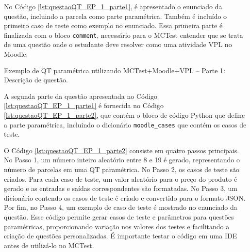 No Código \ref{lst:questaoQT_EP_1_parte1}, é apresentado o enunciado da questão, incluindo a parcela como parte paramétrica. Também é incluído o primeiro caso de teste como exemplo no enunciado. Essa primeira parte é finalizada com o bloco \verb|comment|, necessário para o MCTest entender que se trata de uma questão onde o estudante deve resolver como uma atividade VPL no Moodle.


\begin{listing}[!ht]
\caption{Exemplo de QT paramétrica utilizando MCTest+Moodle+VPL -- Parte 1: Descrição de questão.}
\label{lst:questaoQT_EP_1_parte1}
\end{listing}


A segunda parte da questão apresentada no Código \ref{lst:questaoQT_EP_1_parte1} é fornecida no Código \ref{lst:questaoQT_EP_1_parte2}, que contém o bloco de código Python que define a parte paramétrica, incluindo o dicionário \verb|moodle_cases| que contém os casos de teste.

O Código \ref{lst:questaoQT_EP_1_parte2} consiste em quatro passos principais. No Passo 1, um número inteiro aleatório entre 8 e 19 é gerado, representando o número de parcelas em uma QT paramétrica. No Passo 2, os casos de teste são criados. Para cada caso de teste, um valor aleatório para o preço do produto é gerado e as entradas e saídas correspondentes são formatadas. No Passo 3, um dicionário contendo os casos de teste é criado e convertido para o formato JSON. Por fim, no Passo 4, um exemplo de caso de teste é mostrado no enunciado da questão. Esse código permite gerar casos de teste e parâmetros para questões paramétricas, proporcionando variação nos valores dos testes e facilitando a criação de questões personalizadas. É importante testar o código em uma IDE antes de utilizá-lo no MCTest.

